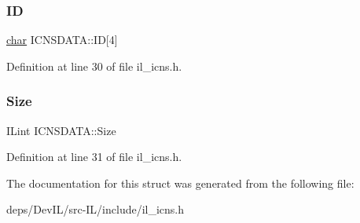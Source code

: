 \subsubsection{\texorpdfstring{ID}{ID}}
{\footnotesize\ttfamily \hyperlink{classchar}{char} I\+C\+N\+S\+D\+A\+T\+A\+::\+ID\mbox{[}4\mbox{]}}



Definition at line 30 of file il\+\_\+icns.\+h.

\mbox{\label{structICNSDATA_a95f5c1d922a2385d285db1e2102e00c2}} 
\subsubsection{\texorpdfstring{Size}{Size}}
{\footnotesize\ttfamily I\+Lint I\+C\+N\+S\+D\+A\+T\+A\+::\+Size}



Definition at line 31 of file il\+\_\+icns.\+h.



The documentation for this struct was generated from the following file\+:\begin{DoxyCompactItemize}
\item 
deps/\+Dev\+I\+L/src-\/\+I\+L/include/il\+\_\+icns.\+h\end{DoxyCompactItemize}
